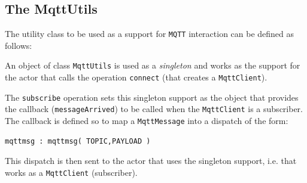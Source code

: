 \subsection{The MqttUtils}
The \java{} utility class to be used as a support for \texttt{MQTT} interaction can be defined as follows:



An object of class \texttt{MqttUtils} is used as a \textit{singleton} and works as the support for the actor that calls the operation \texttt{connect} (that creates a \texttt{MqttClient}).

The \texttt{subscribe} operation sets this singleton support as the object that provides the callback (\texttt{messageArrived}) to be called when the \texttt{MqttClient} is a subscriber. The callback is defined so to map a \texttt{MqttMessage} into a dispatch of the form:

\begin{Verbatim}[fontsize=\scriptsize, frame=single]
mqttmsg : mqttmsg( TOPIC,PAYLOAD )
\end{Verbatim}

This dispatch is then sent to the actor that uses the singleton support, i.e. that works as a \texttt{MqttClient} (subscriber).


 

 

 
 